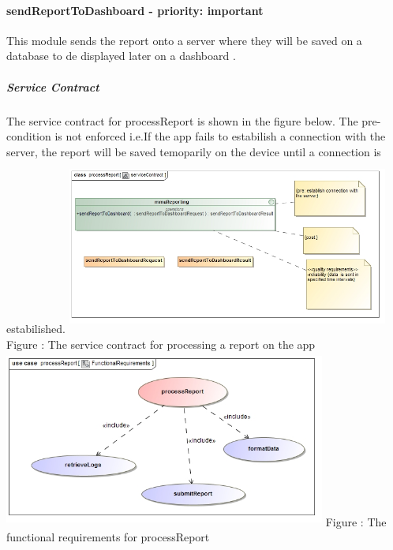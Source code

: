 \documentclass[hidelinks, 12pt, oneside]{article}
\begin{document}
		\paragraph{ sendReportToDashboard - priority: important}
		This module sends the report onto a server where they will be saved on a database to de displayed later on a dashboard .\newline
		\subparagraph{Service Contract}
			The service contract for processReport is shown in the figure below. The pre-condition is not enforced i.e.If the app fails to estabilish a connection with the server, the report will be saved temoparily on the device until a connection is estabilished.\newline
		\includegraphics[width=400px,height=220px]{img/serviceContractReporting.jpg}
			Figure : The service contract for processing a report on the app\newline \newline \newline
		\includegraphics[width=400px,height=220px]{img/FunctionalRequirementsReporting.jpg}
			Figure : The functional requirements for processReport\newline	
\end{document}
